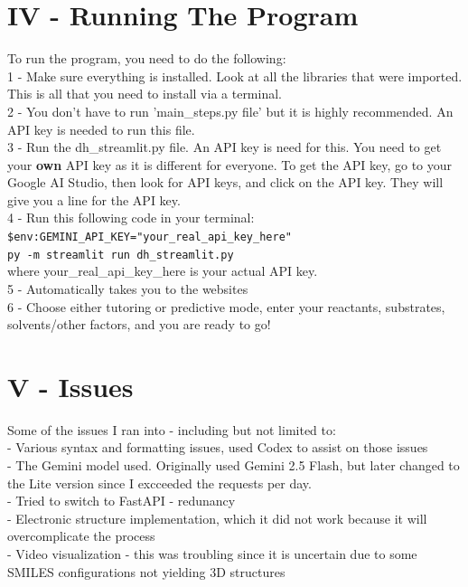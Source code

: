\documentclass{article}
\begin{document}
\section*{IV - Running The Program}
To run the program, you need to do the following:
\\[2em]
1 - Make sure everything is installed. Look at all the libraries that were imported. This is all that you need to install via a terminal.
\\[2em]
2 - You don't have to run 'main\_steps.py file' but it is highly recommended. An API key is needed to run this file.
\\[2em]
3 - Run the dh\_streamlit.py file. An API key is need for this. You need to get your
\textbf{own} API key as it is different for everyone. To get the API key, go to your Google AI Studio, then look for API keys, and click on the API key. They will give you a line for the API key.
\\[2em]
4 - Run this following code in your terminal:
\\[2em]
\texttt{\$env:GEMINI\_API\_KEY="your\_real\_api\_key\_here"} \\
\texttt{py -m streamlit run dh\_streamlit.py}
\\[1em]
where your\_real\_api\_key\_here is your actual API key.
\\[2em]
5 - Automatically takes you to the websites
\\[2em]
6 - Choose either tutoring or predictive mode, enter your reactants, substrates, solvents/other factors, and you are ready to go!
\\[2em]

\section*{V - Issues}
Some of the issues I ran into - including but not limited to:
\\[2em]
- Various syntax and formatting issues, used Codex to assist on those issues
\\[1em]
- The Gemini model used. Originally used Gemini 2.5 Flash, but later changed to the Lite version since I excceeded the requests per day.
\\[1em]
- Tried to switch to FastAPI - redunancy
\\[1em]
- Electronic structure implementation, which it did not work because it will overcomplicate the process
\\[1em]
- Video visualization - this was troubling since it is uncertain due to some SMILES configurations not yielding 3D structures
\\[2em]
\end{document}
